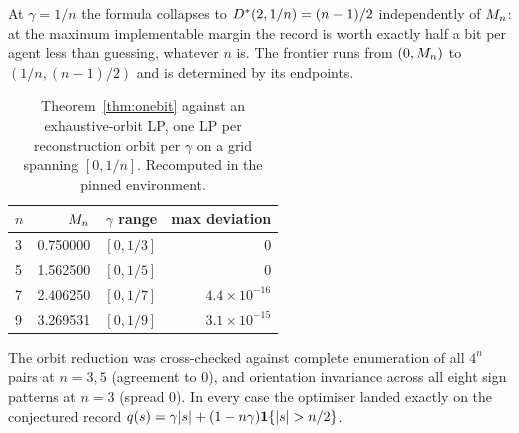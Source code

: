 \begin{remark}[Endpoint]
\label{rem:endpoint}
At $\gamma = 1/n$ the formula collapses to $D^\ast(2,1/n) = (n-1)/2$
independently of $M_n$: at the maximum implementable margin the record is worth
exactly half a bit per agent less than guessing, whatever $n$ is. The frontier
runs from $(0,M_n)$ to $(1/n,(n-1)/2)$ and is determined by its endpoints.
\end{remark}

\begin{table}[t]
\centering
\caption{Theorem~\ref{thm:onebit} against an exhaustive-orbit LP, one LP per
reconstruction orbit per $\gamma$ on a grid spanning $[0,1/n]$. Recomputed in the
pinned environment.}
\label{tab:onebit}
\small
\begin{tabular}{@{}lrrr@{}}
\toprule
$n$ & $M_n$ & $\gamma$ range & max deviation \\
\midrule
3 & 0.750000 & $[0, 1/3]$ & $0$ \\
5 & 1.562500 & $[0, 1/5]$ & $0$ \\
7 & 2.406250 & $[0, 1/7]$ & $4.4\times10^{-16}$ \\
9 & 3.269531 & $[0, 1/9]$ & $3.1\times10^{-15}$ \\
\bottomrule
\end{tabular}
\end{table}

The orbit reduction was cross-checked against complete enumeration of all $4^n$
pairs at $n = 3,5$ (agreement to $0$), and orientation invariance across all
eight sign patterns at $n = 3$ (spread $0$). In every case the optimiser landed
exactly on the conjectured record
$q(s) = \gamma|s| + (1-n\gamma)\mathbf{1}\{|s| > n/2\}$.
